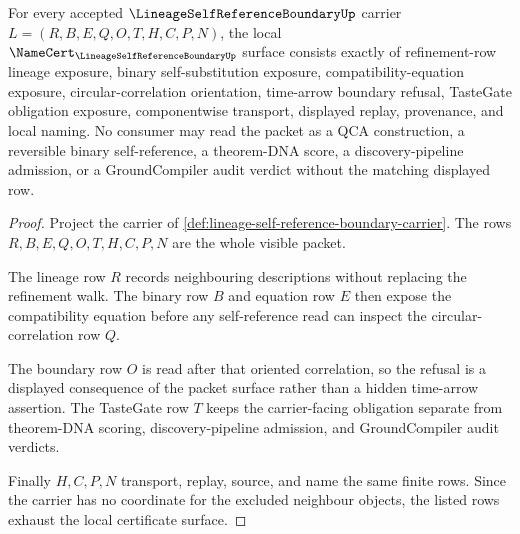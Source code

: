 \begin{theorem}
\label{thm:lineage-self-reference-boundary-namecert-obligations}
For every accepted $\LineageSelfReferenceBoundaryUp$ carrier $L=(R,B,E,Q,O,T,H,C,P,N)$, the local $\NameCert_{\LineageSelfReferenceBoundaryUp}$ surface consists exactly of refinement-row lineage exposure, binary self-substitution exposure, compatibility-equation exposure, circular-correlation orientation, time-arrow boundary refusal, TasteGate obligation exposure, componentwise transport, displayed replay, provenance, and local naming. No consumer may read the packet as a QCA construction, a reversible binary self-reference, a theorem-DNA score, a discovery-pipeline admission, or a GroundCompiler audit verdict without the matching displayed row.
\end{theorem}
\begin{proof}
Project the carrier of \autoref{def:lineage-self-reference-boundary-carrier}. The rows $R,B,E,Q,O,T,H,C,P,N$ are the whole visible packet.

The lineage row $R$ records neighbouring descriptions without replacing the refinement walk. The binary row $B$ and equation row $E$ then expose the compatibility equation before any self-reference read can inspect the circular-correlation row $Q$.

The boundary row $O$ is read after that oriented correlation, so the refusal is a displayed consequence of the packet surface rather than a hidden time-arrow assertion. The TasteGate row $T$ keeps the carrier-facing obligation separate from theorem-DNA scoring, discovery-pipeline admission, and GroundCompiler audit verdicts.

Finally $H,C,P,N$ transport, replay, source, and name the same finite rows. Since the carrier has no coordinate for the excluded neighbour objects, the listed rows exhaust the local certificate surface.
\end{proof}



